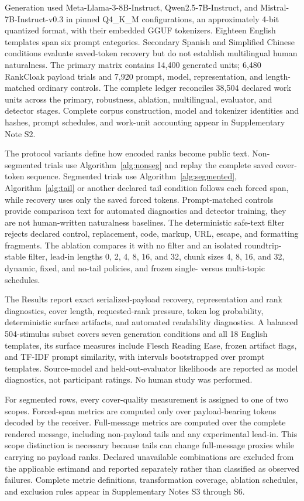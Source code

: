 \documentclass[fleqn,10pt]{wlscirep}
\begin{document}
Generation used Meta-Llama-3-8B-Instruct, Qwen2.5-7B-Instruct, and Mistral-7B-Instruct-v0.3 in pinned Q4\_K\_M configurations, an approximately 4-bit quantized format, with their embedded GGUF tokenizers. Eighteen English templates span six prompt categories. Secondary Spanish and Simplified Chinese conditions evaluate saved-token recovery but do not establish multilingual human naturalness. The primary matrix contains 14,400 generated units; 6,480 RankCloak payload trials and 7,920 prompt, model, representation, and length-matched ordinary controls. The complete ledger reconciles 38,504 declared work units across the primary, robustness, ablation, multilingual, evaluator, and detector stages. Complete corpus construction, model and tokenizer identities and hashes, prompt schedules, and work-unit accounting appear in Supplementary Note S2.

The protocol variants define how encoded ranks become public text. Non-segmented trials use Algorithm~\ref{alg:nonseg} and replay the complete saved cover-token sequence. Segmented trials use Algorithm~\ref{alg:segmented}, Algorithm~\ref{alg:tail} or another declared tail condition follows each forced span, while recovery uses only the saved forced tokens. Prompt-matched controls provide comparison text for automated diagnostics and detector training, they are not human-written naturalness baselines. The deterministic safe-text filter rejects declared control, replacement, code, markup, URL, escape, and formatting fragments. The ablation compares it with no filter and an isolated roundtrip-stable filter, lead-in lengths 0, 2, 4, 8, 16, and 32, chunk sizes 4, 8, 16, and 32, dynamic, fixed, and no-tail policies, and frozen single- versus multi-topic schedules.

The Results report exact serialized-payload recovery, representation and rank diagnostics, cover length, requested-rank pressure, token log probability, deterministic surface artifacts, and automated readability diagnostics. A balanced 504-stimulus subset covers seven generation conditions and all 18 English templates, its surface measures include Flesch Reading Ease\cite{Flesch1948Readability}, frozen artifact flags, and TF-IDF prompt similarity, with intervals bootstrapped over prompt templates. Source-model and held-out-evaluator likelihoods are reported as model diagnostics, not participant ratings. No human study was performed.

For segmented rows, every cover-quality measurement is assigned to one of two scopes. Forced-span metrics are computed only over payload-bearing tokens decoded by the receiver. Full-message metrics are computed over the complete rendered message, including non-payload tails and any experimental lead-in. This scope distinction is necessary because tails can change full-message proxies while carrying no payload ranks. Declared unavailable combinations are excluded from the applicable estimand and reported separately rather than classified as observed failures. Complete metric definitions, transformation coverage, ablation schedules, and exclusion rules appear in Supplementary Notes S3 through S6.
\end{document}

